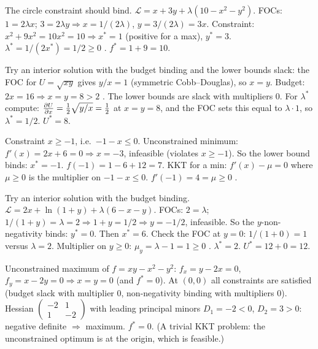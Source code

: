 \begin{solutions}
  \item The circle constraint should bind.
        $\mathcal{L} = x + 3 y + \lambda(10 - x^2 - y^2)$. FOCs:
        $1 = 2 \lambda x$; $3 = 2 \lambda y \Rightarrow
        x = 1/(2 \lambda)$, $y = 3/(2 \lambda) = 3 x$. Constraint:
        $x^2 + 9 x^2 = 10 x^2 = 10 \Rightarrow x^* = 1$ (positive for a
        max), $y^* = 3$. $\lambda^* = 1/(2 x^*) = 1/2 \geq 0$ \checkmark.
        $f^* = 1 + 9 = 10$.

  \item Try an interior solution with the budget binding and the lower
        bounds slack: the FOC for $U = \sqrt{x y}$ gives $y/x = 1$
        (symmetric Cobb--Douglas), so $x = y$. Budget:
        $2 x = 16 \Rightarrow x = y = 8 > 2$ \checkmark. The lower bounds
        are slack with multipliers $0$. For $\lambda^*$ compute:
        $\frac{\partial U}{\partial x} = \tfrac12 \sqrt{y/x} = \tfrac12$ at $x = y = 8$, and
        the FOC sets this equal to $\lambda \cdot 1$, so
        $\lambda^* = 1/2$. $U^* = 8$.

  \item Constraint $x \geq -1$, i.e.\ $-1 - x \leq 0$. Unconstrained
        minimum: $f'(x) = 2 x + 6 = 0 \Rightarrow x = -3$, infeasible
        (violates $x \geq -1$). So the lower bound binds: $x^* = -1$.
        $f(-1) = 1 - 6 + 12 = 7$. KKT for a min: $f'(x) - \mu = 0$ where
        $\mu \geq 0$ is the multiplier on $-1 - x \leq 0$.
        $f'(-1) = 4 = \mu \geq 0$ \checkmark.

  \item Try an interior solution with the budget binding.
        $\mathcal{L} = 2 x + \ln(1 + y) + \lambda(6 - x - y)$. FOCs:
        $2 = \lambda$; $1/(1 + y) = \lambda = 2 \Rightarrow
        1 + y = 1/2 \Rightarrow y = -1/2$, infeasible. So the
        $y$-non-negativity binds: $y^* = 0$. Then $x^* = 6$. Check the FOC
        at $y = 0$: $1/(1 + 0) = 1$ versus $\lambda = 2$. Multiplier on
        $y \geq 0$: $\mu_y = \lambda - 1 = 1 \geq 0$ \checkmark.
        $\lambda^* = 2$. $U^* = 12 + 0 = 12$.

  \item Unconstrained maximum of $f = x y - x^2 - y^2$:
        $f_x = y - 2 x = 0$, $f_y = x - 2 y = 0 \Rightarrow x = y = 0$
        (and $f^* = 0$). At $(0, 0)$ all constraints are satisfied (budget
        slack with multiplier $0$, non-negativity binding with multipliers
        $0$). Hessian
        $\begin{pmatrix} -2 & 1 \\ 1 & -2 \end{pmatrix}$ with leading
        principal minors $D_1 = -2 < 0$, $D_2 = 3 > 0$: negative definite
        $\Rightarrow$ maximum. $f^* = 0$. (A trivial KKT problem: the
        unconstrained optimum is at the origin, which is feasible.)


\end{solutions}
